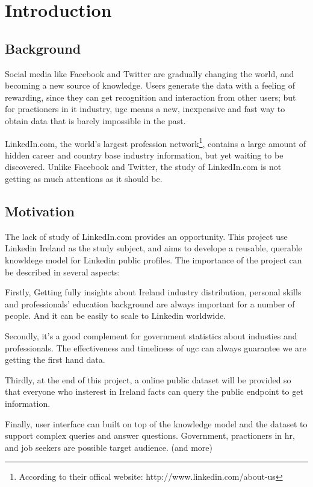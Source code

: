 \chapter{Introduction}

\section{Background}
Social media like Facebook and Twitter are gradually changing the world, and becoming a new source of knowledge. Users generate the data with a feeling of rewarding, since they can get recognition and interaction from other users\cite{krumm2008user}; but for practioners in \gls{it} industry, \gls{ugc} means a new, inexpensive and fast way to obtain data that is barely impossible in the past.

LinkedIn.com, the world's largest profession network\footnote{According to their offical website: http://www.linkedin.com/about-us}, contains a large amount of hidden career and country base industry information, but yet waiting to be discovered. Unlike Facebook and Twitter, the study of LinkedIn.com is not getting as much attentions as it should be. 

\section{Motivation}
The lack of study of LinkedIn.com provides an opportunity. This project use Linkedin Ireland as the study subject, and aims to develope a reusable, querable knowldege model for Linkedin public profiles. The importance of the project can be described in several aspects:

Firstly, Getting fully insights about Ireland industry distribution, personal skills and professionals' education background are always important for a number of people. And it can be easily to scale to Linkedin worldwide.

Secondly, it's a good complement for government statistics about industies and professionals. The effectiveness and timeliness of \acs{ugc} can always guarantee we are getting the first hand data.

Thirdly, at the end of this project, a online public dataset will be provided so that everyone who insterest in Ireland facts can query the public endpoint to get information.

Finally, user interface can built on top of the knowledge model and the dataset to support complex queries and answer questions. Government, practioners in \gls{hr}, and job seekers are possible target audience. (and more)

